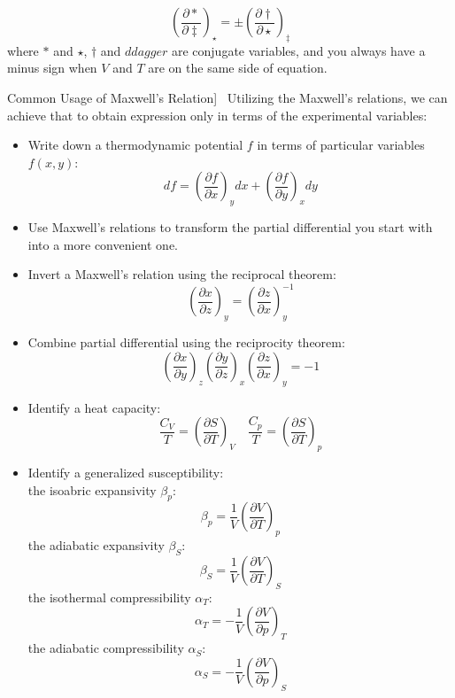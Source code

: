 \documentclass[UTF8]{book}
\newenvironment{theorem}[2][Theorem]{\begin{trivlist}
\item[\hskip \labelsep {\bfseries #1}\hskip \labelsep {\bfseries }]}{\end{trivlist}}
\begin{document}
$$\left(\dfrac{\partial \ast}{\partial \ddagger}\right)_\star=\pm \left(\dfrac{\partial \dagger}{\partial \star}\right)_\ddagger$$
 {where $\ast $ and $\star$, $\dagger$ and $ddagger$ are conjugate variables, and you always have a minus sign when $V$ and $T$ are on the same side of equation.}
\begin{theorem}
[Common Usage of Maxwell's Relation]~  {Utilizing the Maxwell's relations, we can achieve that to obtain expression only in terms of the experimental variables:}
\begin{itemize}
\item  {Write down a thermodynamic potential $f$ in terms of particular variables $f(x,y)$:}
$$df=\left(\dfrac{\partial f}{\partial x}\right)_ydx+\left(\dfrac{\partial f}{\partial y}\right)_xdy$$
\item  {Use Maxwell's relations to transform the partial differential you start with into a more convenient one.} 
\item  {Invert a Maxwell's relation using the reciprocal theorem:}
$$\left(\dfrac{\partial x}{\partial z}\right)_y=\left(\dfrac{\partial z}{\partial x}\right)_y^{-1}$$
\item  {Combine partial differential using the reciprocity theorem:}
$$\left(\dfrac{\partial x}{\partial y}\right)_z\left(\dfrac{\partial y}{\partial z}\right)_x\left(\dfrac{\partial z}{\partial x}\right)_y=-1$$
\item  {Identify a heat capacity:}
$$\dfrac{C_V}{T}=\left(\dfrac{\partial S}{\partial T}\right)_V \quad \dfrac{C_p}{T}=\left(\dfrac{\partial S}{\partial T}\right)_p$$
\item  {Identify a generalized susceptibility:}\\
 {the isoabric expansivity $\beta _p$:}
$$\beta _p =\dfrac{1}{V}\left(\dfrac{\partial V}{\partial T}\right)_p$$
 {the adiabatic expansivity $\beta_S$:}
$$\beta _S =\dfrac{1}{V}\left(\dfrac{\partial V}{\partial T}\right)_S$$
 {the isothermal compressibility $\alpha _T$:}
$$\alpha _T =-\dfrac{1}{V}\left(\dfrac{\partial V}{\partial p}\right)_T$$
 {the adiabatic compressibility $\alpha _S$:}
$$\alpha _S =-\dfrac{1}{V}\left(\dfrac{\partial V}{\partial p}\right)_S$$
\end{itemize}
\end{theorem}
\end{document}
